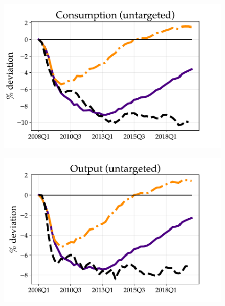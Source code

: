 \begin{figure}[]
\medskip
\begin{minipage}{0.51\textwidth}
\includegraphics[scale=.55]{text/chapter1/Figures/GR_sim/PCE_IPR}
\label{fig:c}
\end{minipage}\hspace*{\fill}
\begin{minipage}{0.51\textwidth}
\includegraphics[scale=.55]{text/chapter1/Figures/GR_sim/GDP}
 \label{fig:d}
\end{minipage}


\end{figure}
